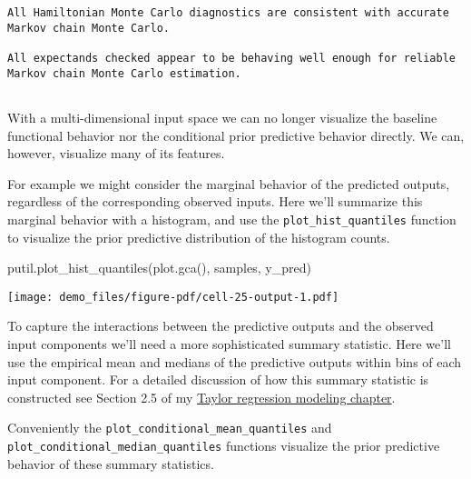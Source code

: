 \documentclass[
  letterpaper,
  DIV=11,
  numbers=noendperiod]{scrartcl}
\newenvironment{Shaded}{\begin{snugshade}}{\end{snugshade}}
\newcommand{\NormalTok}[1]{\textcolor[rgb]{0.00,0.23,0.31}{#1}}
\newcommand{\StringTok}[1]{\textcolor[rgb]{0.13,0.47,0.30}{#1}}
\begin{document}
\begin{verbatim}
All Hamiltonian Monte Carlo diagnostics are consistent with accurate
Markov chain Monte Carlo.
 
All expectands checked appear to be behaving well enough for reliable
Markov chain Monte Carlo estimation.
 
\end{verbatim}

With a multi-dimensional input space we can no longer visualize the
baseline functional behavior nor the conditional prior predictive
behavior directly. We can, however, visualize many of its features.

For example we might consider the marginal behavior of the predicted
outputs, regardless of the corresponding observed inputs. Here we'll
summarize this marginal behavior with a histogram, and use the
\texttt{plot\_hist\_quantiles} function to visualize the prior
predictive distribution of the histogram counts.

\begin{Shaded}
\begin{Highlighting}[]
\NormalTok{putil.plot\_hist\_quantiles(plot.gca(), samples, }\StringTok{\textquotesingle{}y\_pred\textquotesingle{}}\NormalTok{)}
\end{Highlighting}
\end{Shaded}

\texttt{[image: demo\_files/figure-pdf/cell-25-output-1.pdf]}

To capture the interactions between the predictive outputs and the
observed input components we'll need a more sophisticated summary
statistic. Here we'll use the empirical mean and medians of the
predictive outputs within bins of each input component. For a detailed
discussion of how this summary statistic is constructed see Section 2.5
of my
\href{https://betanalpha.github.io/assets/case_studies/taylor_models.html\#25_Posterior_Retrodictive_Checks}{Taylor
regression modeling chapter}.

Conveniently the \texttt{plot\_conditional\_mean\_quantiles} and
\texttt{plot\_conditional\_median\_quantiles} functions visualize the
prior predictive behavior of these summary statistics.
\end{document}
